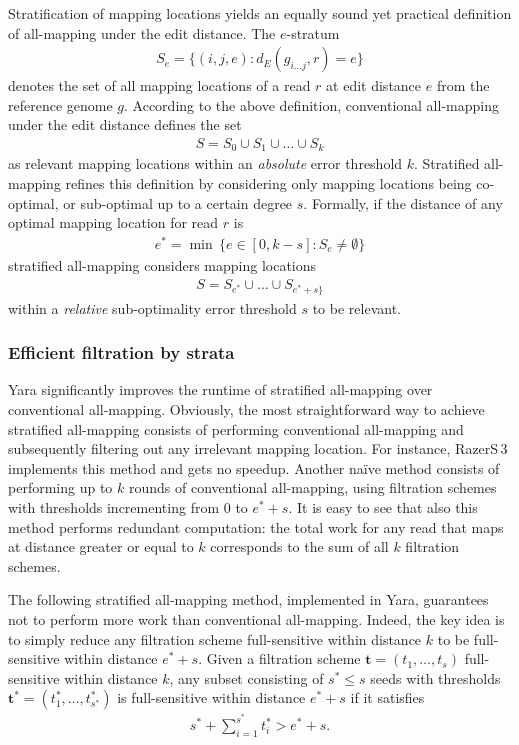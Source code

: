 Stratification of mapping locations yields an equally sound yet practical definition of all-mapping under the edit distance.
The $e$-stratum
\begin{eqnarray}
S_e = \{ (i,j,e) : d_E(g_{i \dots j},r) = e\}
\end{eqnarray}
denotes the set of all mapping locations of a read $r$ at edit distance $e$ from the reference genome $g$.
According to the above definition, conventional all-mapping under the edit distance defines the set
\begin{eqnarray}
S = S_0 \cup S_1 \cup \dots \cup S_k
\end{eqnarray}
as relevant mapping locations within an \emph{absolute} error threshold $k$.
Stratified all-mapping refines this definition by considering only mapping locations being co-optimal, or sub-optimal up to a certain degree $s$.
Formally, if the distance of any optimal mapping location for read $r$ is
\begin{eqnarray}
e^* = \min \,\{ e \in [0,k-s] : S_e \neq \emptyset \}
\end{eqnarray}
stratified all-mapping considers mapping locations
\begin{eqnarray}
S = S_{e^*} \cup \dots \cup S_{e^*+s\}}
\end{eqnarray}
within a \emph{relative} sub-optimality error threshold $s$ to be relevant.

\subsubsection{Efficient filtration by strata}

Yara significantly improves the runtime of stratified all-mapping over conventional all-mapping.
Obviously, the most straightforward way to achieve stratified all-mapping consists of performing conventional all-mapping and subsequently filtering out any irrelevant mapping location.
For instance, RazerS\,3 implements this method and gets no speedup.
Another na\"ive method consists of performing up to $k$ rounds of conventional all-mapping, using filtration schemes with thresholds incrementing from $0$ to $e^*+s$.
It is easy to see that also this method performs redundant computation: the total work for any read that maps at distance greater or equal to $k$ corresponds to the sum of all $k$ filtration schemes.

The following stratified all-mapping method, implemented in Yara, guarantees not to perform more work than conventional all-mapping.
Indeed, the key idea is to simply reduce any filtration scheme full-sensitive within distance $k$ to be full-sensitive within distance $e^*+s$.
Given a filtration scheme $\mathbf{t}=(t_1,\dots,t_s)$ full-sensitive within distance $k$, any subset consisting of $s^* \leq s$ seeds with thresholds $\mathbf{t^*}=(t^{*}_{1},\dots,t^{*}_{s^*})$ is full-sensitive within distance $e^*+s$ if it satisfies
\begin{eqnarray}
s^* + \sum_{i=1}^{s^*} t_i^* > e^*+s.
\end{eqnarray}

